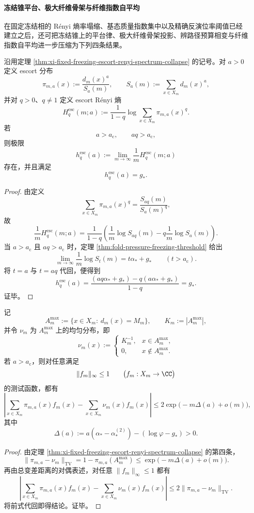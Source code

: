 \paragraph{冻结锥平台、极大纤维骨架与纤维指数自平均}
在固定冻结相的 Rényi 熵率塌缩、基态质量指数集中以及精确反演位率阈值已经建立之后，还可把冻结锥上的平台律、极大纤维骨架投影、辨路径预算相变与纤维指数自平均进一步压缩为下列四条结果。

\begin{theorem}\label{thm:xi-fixed-freezing-cone-escort-renyi-plateau}
沿用定理 \ref{thm:xi-fixed-freezing-escort-renyi-spectrum-collapse} 的记号。对 \(a>0\) 定义 escort 分布
\[
\pi_{m,a}(x):=\frac{d_m(x)^a}{S_a(m)},
\qquad
S_a(m):=\sum_{x\in X_m}d_m(x)^a,
\]
并对 \(q>0\)、\(q\neq 1\) 定义 escort Rényi 熵
\[
H_q^{\mathrm{esc}}(m;a):=
\frac{1}{1-q}\log\sum_{x\in X_m}\pi_{m,a}(x)^q.
\]
若
\[
a>a_{\mathrm c},
\qquad
aq>a_{\mathrm c},
\]
则极限
\[
h_q^{\mathrm{esc}}(a):=
\lim_{m\to\infty}\frac1m H_q^{\mathrm{esc}}(m;a)
\]
存在，并且满足
\[
h_q^{\mathrm{esc}}(a)=g_*.
\]
\end{theorem}
\begin{proof}
由定义
\[
\sum_{x\in X_m}\pi_{m,a}(x)^q
=
\frac{S_{aq}(m)}{S_a(m)^q},
\]
故
\[
\frac1m H_q^{\mathrm{esc}}(m;a)
=
\frac{1}{1-q}
\left(
\frac1m\log S_{aq}(m)-q\frac1m\log S_a(m)
\right).
\]
当 \(a>a_{\mathrm c}\) 且 \(aq>a_{\mathrm c}\) 时，定理 \ref{thm:fold-pressure-freezing-threshold} 给出
\[
\lim_{m\to\infty}\frac1m\log S_t(m)=t\alpha_*+g_*
\qquad
(t>a_{\mathrm c}).
\]
将 \(t=a\) 与 \(t=aq\) 代回，便得到
\[
h_q^{\mathrm{esc}}(a)
=
\frac{(aq\alpha_*+g_*)-q(a\alpha_*+g_*)}{1-q}
=
g_*.
\]
证毕。
\end{proof}

\begin{theorem}[冻结相的极大纤维骨架投影]\label{thm:xi-fixed-freezing-maxfiber-skeleton-projection}
记
\[
A_m^{\max}:=\{x\in X_m:\ d_m(x)=M_m\},
\qquad
K_m:=|A_m^{\max}|,
\]
并令 \(\nu_m\) 为 \(A_m^{\max}\) 上的均匀分布，即
\[
\nu_m(x):=
\begin{cases}
K_m^{-1}, & x\in A_m^{\max},\\
0, & x\notin A_m^{\max}.
\end{cases}
\]
若 \(a>a_{\mathrm c}\)，则对任意满足
\[
\|f_m\|_{\infty}\le 1
\qquad
\bigl(f_m:X_m\to\CC\bigr)
\]
的测试函数，都有
\[
\left|
\sum_{x\in X_m}\pi_{m,a}(x)f_m(x)
-
\sum_{x\in X_m}\nu_m(x)f_m(x)
\right|
\le
2\exp\!\bigl(-m\Delta(a)+o(m)\bigr),
\]
其中
\[
\Delta(a):=a(\alpha_*-\alpha_*^{(2)})-(\log\varphi-g_*)>0.
\]
\end{theorem}
\begin{proof}
由定理 \ref{thm:xi-fixed-freezing-escort-renyi-spectrum-collapse} 的第四条，
\[
\|\pi_{m,a}-\nu_m\|_{\mathrm{TV}}
=
1-\pi_{m,a}(A_m^{\max})
\le
\exp\!\bigl(-m\Delta(a)+o(m)\bigr).
\]
再由总变差距离的对偶表述，对任意 \(\|f_m\|_\infty\le 1\) 都有
\[
\left|
\sum_{x\in X_m}\pi_{m,a}(x)f_m(x)
-
\sum_{x\in X_m}\nu_m(x)f_m(x)
\right|
\le
2\|\pi_{m,a}-\nu_m\|_{\mathrm{TV}}.
\]
将前式代回即得结论。证毕。
\end{proof}

